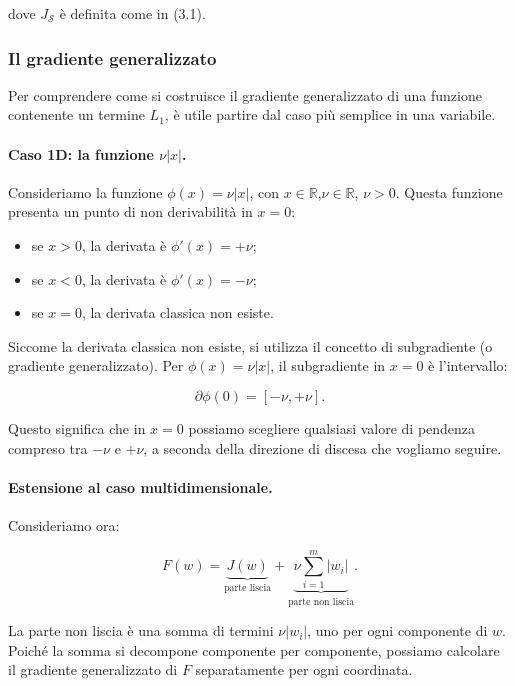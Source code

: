 \documentclass[a4paper,12pt]{article}
\begin{document}
dove $J_{\mathcal{S}}$ è definita come in (3.1).

\subsubsection{Il gradiente generalizzato}

Per comprendere come si costruisce il gradiente generalizzato di una funzione
contenente un termine $L_1$, è utile partire dal caso più semplice in una variabile.

\paragraph{Caso 1D: la funzione $\nu|x|$.}

Consideriamo la funzione $\phi(x) = \nu |x|$, con $x\in\mathbb{R}$,\newline $\nu \in\mathbb{R}$, $\nu> 0$. Questa funzione
presenta un punto di non derivabilità in $x = 0$:

\begin{itemize}
    \item se $x > 0$, la derivata è $\phi'(x) = +\nu$;
    \item se $x < 0$, la derivata è $\phi'(x) = -\nu$;
    \item se $x = 0$, la derivata classica non esiste.
\end{itemize}

Siccome la derivata classica non esiste, si utilizza
il concetto di subgradiente (o gradiente generalizzato). Per
$\phi(x) = \nu|x|$, il subgradiente in $x = 0$ è l'intervallo:

\[
\partial \phi(0) = [-\nu, +\nu].
\]

Questo significa che in $x = 0$ possiamo scegliere qualsiasi valore di pendenza
compreso tra $-\nu$ e $+\nu$, a seconda della direzione di discesa che vogliamo
seguire.

\paragraph{Estensione al caso multidimensionale.}

Consideriamo ora:

\[
F(w) = \underbrace{J(w)}_{\text{parte liscia}} + \underbrace{\nu \sum_{i=1}^m |w_i|}_{\text{parte non liscia}}.
\]

La parte non liscia è una somma di termini $\nu |w_i|$, uno per ogni componente
di $w$. Poiché la somma si decompone componente per componente, possiamo
calcolare il gradiente generalizzato di $F$ separatamente per ogni coordinata.
\end{document}
